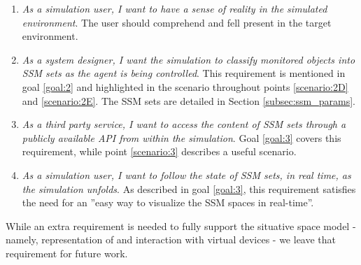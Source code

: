 \begin{enumerate}
	\item[\textlabel{5.}{us:5}] \emph{As a simulation user, I want to have a sense of reality in the simulated environment}. The user should comprehend and fell present in the target environment.

	\item[\textlabel{6.}{us:6}] \emph{As a system designer, I want the simulation to classify monitored objects into SSM sets as the agent is being controlled}. This requirement is mentioned in goal \ref{goal:2} and highlighted in the scenario throughout points \ref{scenario:2D} and \ref{scenario:2E}. The SSM sets are detailed in Section \ref{subsec:ssm_params}.

	\item[\textlabel{7.}{us:7}] \emph{As a third party service, I want to access the content of SSM sets through a publicly available API from within the simulation}. Goal \ref{goal:3} covers this requirement, while point \ref{scenario:3} describes a useful scenario.

	\item[\textlabel{8.}{us:8}] \emph{As a simulation user, I want to follow the state of SSM sets, in real time, as the simulation unfolds}. As described in goal \ref{goal:3}, this requirement satisfies the need for an ''easy way to visualize the SSM spaces in real-time''.

\end{enumerate}

While an extra requirement is needed to fully support the situative space model - namely, representation of and interaction with virtual devices - we leave that requirement for future work.\\

